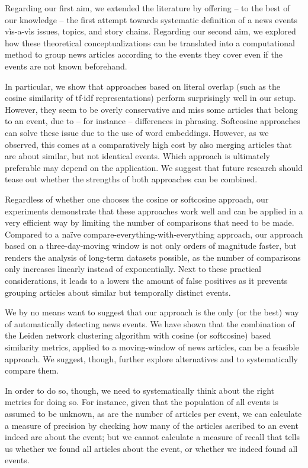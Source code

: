 \documentclass[a4paper,man,natbib,floatsintext,mask]{apa6}
\begin{document}
Regarding our first aim, we extended the literature by offering -- to the best of our knowledge -- the first attempt towards systematic definition of a news events v\`{i}s-a-v\`{i}s issues, topics, and story chains.
Regarding our second aim, we explored how these theoretical conceptualizations can be translated into a computational method to group news articles according to the events they cover even if the events are not known beforehand. 

In particular, we show that approaches based on literal overlap (such as the cosine similarity of tf$\cdot$idf representations) perform surprisingly well in our setup. 
However, they seem to be overly conservative and miss some articles that belong to an event, due to -- for instance -- differences in phrasing. 
Softcosine approaches can solve these issue due to the use of word embeddings. However, as we observed, this comes at a comparatively high cost by also merging articles that are about similar, but not identical events. 
Which approach is ultimately preferable may depend on the application.
We suggest that future research should tease out whether the strengths of both approaches can be combined. 

Regardless of whether one chooses the cosine or softcosine approach, our experiments demonstrate that these approaches work well and can be applied in a very efficient way by limiting the number of comparisons that need to be made.
Compared to a na\"ive compare-everything-with-everything approach, our approach based on a three-day-moving window is not only orders of magnitude faster, but renders the analysis of long-term datasets possible, as the number of comparisons only increases linearly instead of exponentially.
Next to these practical considerations, it leads to a lowers the amount of false positives as it prevents grouping articles about similar but temporally distinct events.


We by no means want to suggest that our approach is the only (or the best) way of automatically detecting news events.
We have shown that the combination of the Leiden network clustering algorithm with cosine (or softcosine) based similarity metrics, applied to a moving-window of news articles, can be a feasible approach.
We suggest, though, further explore alternatives and to systematically compare them.

In order to do so, though, we need to systematically think about the right metrics for doing so.
For instance, given that the population of all events is assumed to be unknown, as are the number of articles per event, we can calculate a measure of precision by checking how many of the articles ascribed to an event indeed are about the event; but we cannot calculate a measure of recall that tells us whether we found all articles about the event, or whether we indeed found all events.
\end{document}
